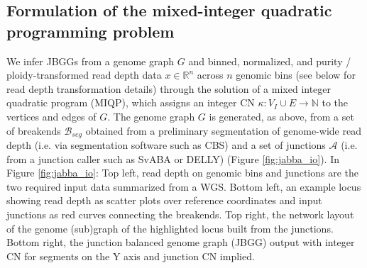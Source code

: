 \documentclass[phd,tocprelim]{cornell}
\renewcommand{\caption}[1]{\singlespacing\hangcaption{#1}\normalspacing}
\begin{document}
\begin{figure}[!h]
\end{figure}
\clearpage

\subsection{Formulation of the mixed-integer quadratic programming problem} \label{sec:jabba_formulation}
We infer JBGGs from a genome graph $G$ and binned, normalized, and purity / ploidy-transformed read depth data $x \in \mathbb{R}^n$ across $n$ genomic bins (see below for read depth transformation details)  through the solution of a mixed integer quadratic program (MIQP), which assigns an integer CN $\kappa:V_I \cup E \rightarrow \mathbb{N}$ to the vertices and edges of $G$.  The genome graph $G$ is generated, as above, from a set of breakends $\mathcal{B}_{seg}$ obtained from a preliminary segmentation of genome-wide read depth (i.e. via segmentation software such as CBS) and a set of junctions $\mathcal{A}$ (i.e. from a junction caller such as SvABA or DELLY) (Figure \ref{fig:jabba_io}). In Figure \ref{fig:jabba_io}: Top left, read depth on genomic bins and junctions are the two required input data summarized from a WGS. Bottom left, an example locus showing read depth as scatter plots over reference coordinates and input junctions as red curves connecting the breakends. Top right, the network layout of the genome (sub)graph of the highlighted locus built from the junctions. Bottom right, the junction balanced genome graph (JBGG) output with integer CN for segments on the Y axis and junction CN implied.
\end{document}
